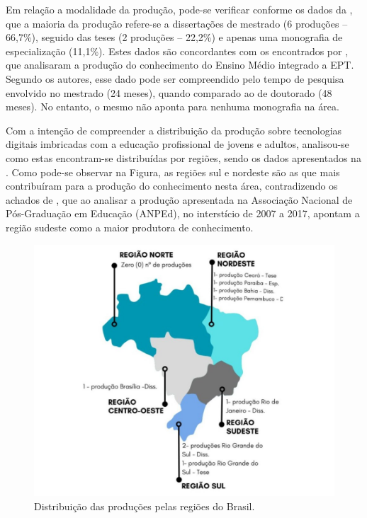 Em relação a modalidade da produção, pode-se verificar conforme os dados
da , que a maioria da produção refere-se a dissertações de
mestrado (6 produções -- 66,7\%), seguido das teses (2 produções --
22,2\%) e apenas uma monografia de especialização (11,1\%). Estes dados
são concordantes com os encontrados por \textcite{minuzzi2020}, que
analisaram a produção do conhecimento do Ensino Médio integrado a EPT.
Segundo os autores, esse dado pode ser compreendido pelo tempo de
pesquisa envolvido no mestrado (24 meses), quando comparado ao de
doutorado (48 meses). No entanto, o mesmo não aponta para nenhuma
monografia na área.

Com a intenção de compreender a distribuição da produção sobre
tecnologias digitais imbricadas com a educação profissional de jovens e
adultos, analisou-se como estas encontram-se distribuídas por regiões,
sendo os dados apresentados na . Como pode-se observar na
Figura, as regiões sul e nordeste são as que mais contribuíram para a
produção do conhecimento nesta área, contradizendo os achados de \textcite{barros_producao_2019}, que ao analisar a produção apresentada na Associação Nacional de Pós-Graduação em Educação (ANPEd), no interstício de 2007 a 2017, apontam a região sudeste como a maior produtora de conhecimento.

\begin{figure}[!htpb]
\centering
\begin{minipage}{.75\textwidth} 
\caption{Distribuição das produções pelas regiões do Brasil.}\label{fig3}
\includegraphics[width=\textwidth]{Fig3.png}
\end{minipage}
\end{figure}


